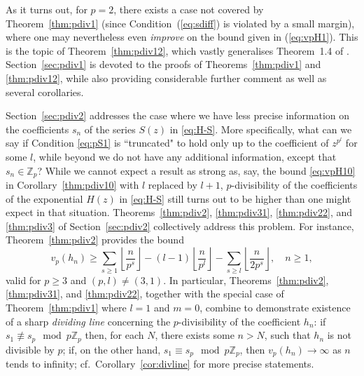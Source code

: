 \documentclass[12pt,reqno]{amsart}
\numberwithin{equation}{section}
\theoremstyle{remark}
\begin{document}
As it turns out, for $p=2$, there exists a case not covered by
Theorem~\ref{thm:pdiv1} (since Condition~(\ref{eq:sdiff}) is violated
by a small margin), where one may nevertheless even \textit{improve}
on the bound given in (\ref{eq:vpH1}). This is the topic of
Theorem~\ref{thm:pdiv12}, which vastly generalises Theorem~1.4 of
\cite{KaTYAA}.  
Section~\ref{sec:pdiv1} is devoted to the proofs of
Theorems~\ref{thm:pdiv1} and \ref{thm:pdiv12}, while also providing
considerable further comment as well as several corollaries. 

Section~\ref{sec:pdiv2} addresses the case where we have less precise
information on the coefficients $s_n$ of the series $S(z)$ in
\eqref{eq:H-S}. More specifically, what can we say if  
Condition \eqref{eq:pS1} is ``truncated" to hold only up to the
coefficient of $z^{p^{l}}$ for some $l$, while beyond we do not have
any additional information, except that $s_n\in {\mathbb{Z}}_p$? While we cannot
expect a result as strong as, say, the bound \eqref{eq:vpH10} 
in Corollary~\ref{thm:pdiv10} with $l$ replaced by $l+1$, 
$p$-divisibility of the coefficients of the exponential $H(z)$ in
\eqref{eq:H-S} still turns out to be higher than one might expect in
that situation. Theorems~\ref{thm:pdiv2}, \ref{thm:pdiv31},
\ref{thm:pdiv22}, and \ref{thm:pdiv3}  of Section~\ref{sec:pdiv2}
collectively address this problem. For instance,
Theorem~\ref{thm:pdiv2} provides the bound 
\[
v_p(h_n) \geq \sum_{s\geq1} {\left\lfloor{\frac{n}{p^s}}\right\rfloor}
-(l-1){\left\lfloor{\frac{n}{p^l}}\right\rfloor}- \sum_{s\geq l}
{\left\lfloor{\frac{n}{2p^s}}\right\rfloor},\quad n\geq1, 
\]
valid for $p\geq3$ and $(p, l)\neq (3,1)$. In particular,
Theorems~\ref{thm:pdiv2}, \ref{thm:pdiv31}, and \ref{thm:pdiv22},
together with the special case of Theorem~\ref{thm:pdiv1} where $l=1$
and $m=0$, combine to demonstrate existence of a sharp
\textit{dividing line} concerning the $p$-divisibility of the coefficient
$h_n$: if $s_1\not\equiv s_p\mod{p{\mathbb{Z}}_p}$ then, for each $N$,
there exists some $n>N$, such that $h_n$ is not divisible by $p$; if,
on the other hand, $s_1 \equiv s_p\mod{p{\mathbb{Z}}_p}$, then $v_p(h_n)
\rightarrow\infty$ as $n$ tends to infinity;
cf.\ Corollary~\ref{cor:divline} for more precise statements.  
\end{document}
